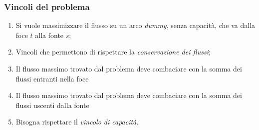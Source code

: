 \documentclass[10pt]{beamer}
\begin{document}
\begin{frame}
  \frametitle{Vincoli del problema}

  \begin{enumerate}
    \item Si vuole massimizzare il flusso su un arco \emph{dummy}, senza capacità, che va dalla foce $t$ alla fonte $s$;
    \item Vincoli che permettono di rispettare la \emph{conservazione dei flussi};
    \item Il flusso massimo trovato dal problema deve combaciare con la somma dei flussi entranti nella foce
    \item Il flusso massimo trovato dal problema deve combaciare con la somma dei flussi uscenti dalla fonte
    \item Bisogna rispettare il \emph{vincolo di capacità}.
\end{enumerate}

\end{frame}
\end{document}

